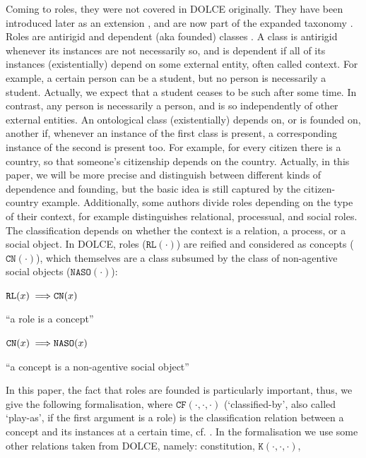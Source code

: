 \documentclass[sw]{iosart2x}
\newcommand{\bflist}{\begin{list}{}{\setlength{\topsep}{2mm}\setlength{\partopsep}{0mm}\setlength{\parsep}{0mm}\setlength{\leftmargin}{9mm}\setlength{\labelwidth}{8mm}}}
\newcommand{\eflist}{\end{list}}
\newcommand{\AxLabel}{\textrm{a}}
\newcounter{cntax}
\newcommand{\myax}[1]{\refstepcounter{cntax}\begin{small}{\bf \AxLabel\thecntax\label{ax:#1}}\end{small}}
\newcommand{\mytext}[1]{``#1''}
\newcommand{\generalStyle}[1]{\texttt{#1}}
\newcommand{\uniRel}[2]{\generalStyle{#1}(#2)}
\newcommand{\triRel}[4]{\generalStyle{#1}(#2,#3,#4)}
\newcommand{\myfi}{\hspace{0.9mm} \Longrightarrow}
\newcommand{\DOLCE}{\textsc{DOLCE}\xspace} %
\newcommand{\DOLCERole}[1]{\uniRel{{RL}}{#1}}
\newcommand{\DOLCENASO}[1]{\uniRel{{NASO}}{#1}}
\newcommand{\DOLCEConcept}[1]{\uniRel{{CN}}{#1}}
\newcommand{\DOLCEK}[3]{\triRel{{K}}{#1}{#2}{#3}}
\newcommand{\DOLCECLby}[3]{\triRel{CF}{#1}{#2}{#3}}
\begin{document}
Coming to roles, they were not covered in \DOLCE originally. They have been introduced later as an extension \cite{masoloSocialRolesTheir2004}, and are now part of the expanded taxonomy \cite{borgoDOLCEDescriptiveOntology2022}.
Roles are antirigid and dependent (aka founded) classes \cite{guarinoOverviewOntoClean2009, guarinoFormalOntologyProperties2000,masoloSocialRolesTheir2004}. 
A class is antirigid whenever its instances are not necessarily so, and is dependent if all of its instances (existentially) depend on some external entity, often called context.
For example, a certain person can be a student, but no person is necessarily a student. Actually, we expect that a student ceases to be such after some time. 
In contrast, any person is necessarily a person, and is so independently of other external entities.
An ontological class (existentially) depends on, or is founded on, another if, whenever an instance of the first class is present, a corresponding instance of the second is present too.
For example, for every citizen there is a country, so that someone's citizenship depends on the country. Actually, in this paper, we will be more precise and distinguish between different kinds of dependence and founding, but the basic idea is still captured by the citizen-country example. 
Additionally, some authors divide roles depending on the type of their context, 
for example \cite{loebeAbstractVsSocial2007} distinguishes relational, processual, and social roles. The classification depends on whether the context is a relation, a process, or a social object. 
In \DOLCE, roles ($\DOLCERole{\cdot}$) are reified and considered as concepts ($\DOLCEConcept{\cdot}$), which themselves are a class subsumed by the class of non-agentive social objects ($\DOLCENASO{\cdot}$):
\bflist
  \item[\myax{roleSussum}] $ \DOLCERole{x} \myfi \DOLCEConcept{x}$
  \item[] \mytext{a role is a concept}
  \item[\myax{roleSussum2}] $\DOLCEConcept{x} \myfi \DOLCENASO{x}$
  \item[] \mytext{a concept is a non-agentive social object}
\eflist
In this paper, the fact that roles are founded is particularly important, thus, we give the following formalisation, where $\DOLCECLby{\cdot}{\cdot}{\cdot}$ (`classified-by', also called `play-as', if the first argument is a role) is the classification relation between a concept and its instances at a certain time, cf. \cite{masoloSocialRolesTheir2004}. In the formalisation we use some other relations taken from \DOLCE, namely: constitution, $\DOLCEK{\cdot}{\cdot}{\cdot}$,
\end{document}
